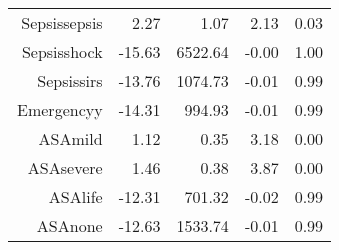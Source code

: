 \begin{tabular}{rrrrr}
$$  Sepsis\-sepsis & 2.27 & 1.07 & 2.13 & 0.03 \\ 
  Sepsis\-shock & -15.63 & 6522.64 & -0.00 & 1.00 \\ 
  Sepsis\-sirs & -13.76 & 1074.73 & -0.01 & 0.99 \\ 
  Emergency\-y & -14.31 & 994.93 & -0.01 & 0.99 \\ 
  ASA\-mild & 1.12 & 0.35 & 3.18 & 0.00 \\ 
  ASA\-severe & 1.46 & 0.38 & 3.87 & 0.00 \\ 
  ASA\-life & -12.31 & 701.32 & -0.02 & 0.99 \\ 
  ASA\-none & -12.63 & 1533.74 & -0.01 & 0.99 \\ 
   \hline
\end{tabular}

